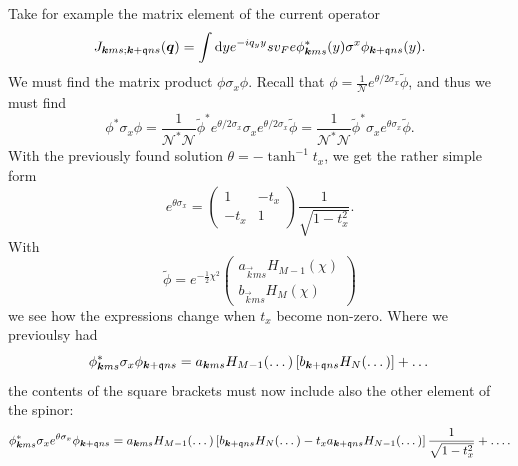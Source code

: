 Take for example the matrix element of the current operator
\[
  J_{\bm{k} m s; \bm{k}+\mathfrak{q} n s } (\bm{q}) = \int \mathrm{d}y e^{-i q_{y} y}
  s v_{F} e \phi ^{*}_{\bm{k} m s} (y) \sigma ^{x} \phi _{\bm{k} + \mathfrak{q} n s}(y).
\]
We must find the matrix product \(\phi \sigma_{x} \phi \).
Recall that \(\phi = \frac{1}{\mathcal{N}} e^{\theta /2 \sigma _{x}} \tilde{\phi} \), and thus we must find
\[
  \phi ^{*} \sigma _{x} \phi = \frac{1}{\mathcal{N}^{*} \mathcal{N}} \tilde{\phi}^{*} e^{\theta /2 \sigma _{x}} \sigma _{x} e^{\theta /2 \sigma _{x}} \tilde{\phi} =  \frac{1}{\mathcal{N}^{*} \mathcal{N}} \tilde{\phi}^{*} \sigma _{x} e^{\theta \sigma _{x}} \tilde{\phi}.
\]
With the previously found solution \(\theta = - \tanh ^{-1} t_{x}\), we get the rather simple form
\[
  e^{\theta \sigma _{x}} =
  \begin{pmatrix}
    1 & -t_{x}\\
    -t_{x} & 1
  \end{pmatrix}
  \frac{1}{\sqrt{1-t_{x}^2}}.
\]
With
\begin{equation}\label{eq:45}
  \tilde{\phi} = e^{-\frac{1}{2} \chi ^2}
  \begin{pmatrix}
    a_{\vec{k} m s} H_{M-1} (\chi)\\
    b_{\vec{k} m s} H_{M} (\chi)
  \end{pmatrix}
\end{equation}
we see how the expressions change when \(t_{x}\) become non-zero.
Where we previoulsy had
\begin{equation}
  \label{eq:27}
  \phi ^{*}_{\bm{k} m s} \sigma _{x} \phi _{\bm{k} + \mathfrak{q} n s}
  =
  a_{\bm{k} m s} H_{M-1}(\dots) \left[ b_{\bm{k}+\mathfrak{q} n s} H_{N}(\dots) \right]
  + \dots
\end{equation}
the contents of the square brackets must now include also the other element of the spinor:
\begin{equation}
  \label{eq:28}
  \phi ^{*}_{\bm{k} m s} \sigma _{x} e^{\theta \sigma _{x}} \phi _{\bm{k} + \mathfrak{q} n s}
  =
  a_{\bm{k} m s} H_{M-1}(\dots)
  \left[
    b_{\bm{k}+\mathfrak{q} n s} H_{N}(\dots)
    - t_{x} a_{\bm{k} + \mathfrak{q} n s} H_{N-1} (\dots)
  \right]
  \frac{1}{\sqrt{1-t_{x}^2}}
  + \dots .
\end{equation}

